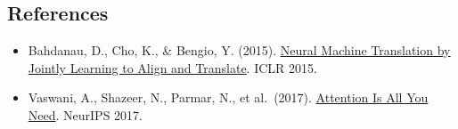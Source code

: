 \FloatBarrier
{}
\hypertarget{references-67}{%
\subsection{References}\label{references-67}}

\vspace{0.25em}
\begin{itemize}
\tightlist
\item
  Bahdanau, D., Cho, K., \& Bengio, Y. (2015). \href{https://arxiv.org/abs/1409.0473}{Neural Machine Translation by Jointly Learning to Align and Translate}. ICLR 2015.
\item
  Vaswani, A., Shazeer, N., Parmar, N., et al.~(2017). \href{https://arxiv.org/abs/1706.03762}{Attention Is All You Need}. NeurIPS 2017.
\end{itemize}

\clearpage
